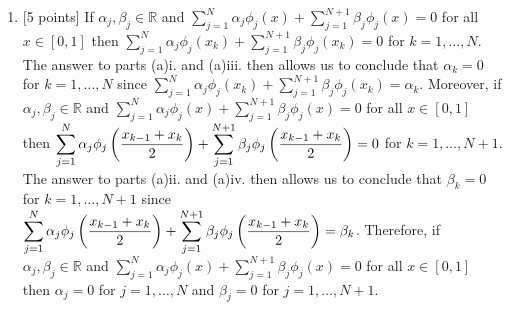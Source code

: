\begin{solution}
\begin{enumerate}
\vspace*{1em}
\item {[5 points]} If $\alpha_j,\beta_j\in\mathbb{R}$ and $\displaystyle{\sum_{j=1}^N\alpha_j\phi_j\left(x\right)+\sum_{j=1}^{N+1}\beta_j\phi_j\left(x\right)=0}$ for all $x\in[0,1]$ then $\displaystyle{\sum_{j=1}^N\alpha_j\phi_j\left(x_k\right)+\sum_{j=1}^{N+1}\beta_j\phi_j\left(x_k\right)=0}$ for $k=1,\ldots,N$. The answer to parts (a)i. and (a)iii. then allows us to conclude that $\alpha_k=0$ for $k=1,\ldots,N$ since $\displaystyle{\sum_{j=1}^N\alpha_j\phi_j\left(x_k\right)+\sum_{j=1}^{N+1}\beta_j\phi_j\left(x_k\right)=\alpha_k}$. Moreover, if $\alpha_j,\beta_j\in\mathbb{R}$ and $\displaystyle{\sum_{j=1}^N\alpha_j\phi_j\left(x\right)+\sum_{j=1}^{N+1}\beta_j\phi_j\left(x\right)=0}$ for all $x\in[0,1]$ then $\displaystyle{\sum_{j=1}^N\alpha_j\phi_j\left({x_{k-1}+x_k \over 2}\right)+\sum_{j=1}^{N+1}\beta_j\phi_j\left({x_{k-1}+x_k \over 2}\right)=0}$ for $k=1,\ldots,N+1$. The answer to parts (a)ii. and (a)iv. then allows us to conclude that $\beta_k=0$ for $k=1,\ldots,N+1$ since $\displaystyle{\sum_{j=1}^N\alpha_j\phi_j\left({x_{k-1}+x_k \over 2}\right)+\sum_{j=1}^{N+1}\beta_j\phi_j\left({x_{k-1}+x_k \over 2}\right)=\beta_k}$. Therefore, if $\alpha_j,\beta_j\in\mathbb{R}$ and $\displaystyle{\sum_{j=1}^N\alpha_j\phi_j\left(x\right)+\sum_{j=1}^{N+1}\beta_j\phi_j\left(x\right)=0}$ for all $x\in[0,1]$ then $\alpha_j=0$ for $j=1,\ldots,N$ and $\beta_j=0$ for $j=1,\ldots,N+1$.


\end{enumerate}
\end{solution}
